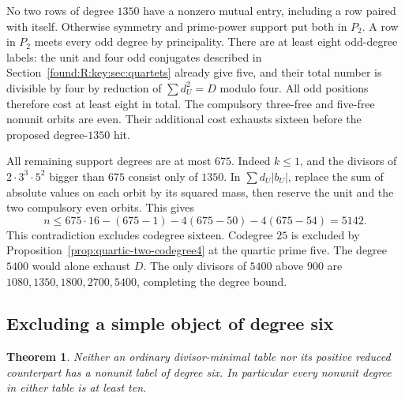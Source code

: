 \documentclass[11pt,a4paper]{article}
\numberwithin{equation}{section}
\newtheorem{theorem}{Theorem}[section]
\theoremstyle{remark}
\begin{document}
No two rows of degree $1350$ have a nonzero mutual entry, including a row paired with itself. Otherwise symmetry and prime-power support put both in $P_2$. A row in $P_2$ meets every odd degree by principality. There are at least eight odd-degree labels: the unit and four odd conjugates described in Section~\ref{found:R:key:sec:quartets} already give five, and their total number is divisible by four by reduction of $\sum d_U^2=D$ modulo four. All odd positions therefore cost at least eight in total. The compulsory three-free and five-free nonunit orbits are even. Their additional cost exhausts sixteen before the proposed degree-$1350$ hit.

All remaining support degrees are at most $675$. Indeed $k\le1$, and the divisors of $2\cdot3^3\cdot5^2$ bigger than $675$ consist only of $1350$. In $\sum d_U|b_U|$, replace the sum of absolute values on each orbit by its squared mass, then reserve the unit and the two compulsory even orbits. This gives
\[
 n\le 675\cdot16-(675-1)-4(675-50)-4(675-54)=5142.
\]
This contradiction excludes codegree sixteen. Codegree $25$ is excluded by Proposition~\ref{prop:quartic-two-codegree4} at the quartic prime five. The degree $5400$ would alone exhaust $D$. The only divisors of $5400$ above $900$ are $1080,1350,1800,2700,5400$, completing the degree bound.

\subsection{Excluding a simple object of degree six}\label{found:D:1}
\begin{theorem}\label{found:D:1.1}\label{found:D:key:thm:spectral-six}
Neither an ordinary divisor-minimal table nor its positive reduced
counterpart has a nonunit label of degree six. In particular every nonunit degree in either table is at least ten.
\end{theorem}
\end{document}

